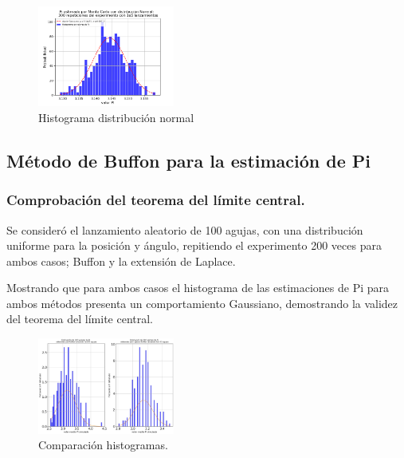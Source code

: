 \documentclass{rbf}
\begin{document}
\begin{figure}[tbp!]
 \centering
  \includegraphics[width=0.4\textwidth]{figures/MCdistNorm.png}
	\caption{Histograma distribución normal}
 \label{buff}
\end{figure}
\subsection{Método de Buffon para la estimación de Pi}
\subsubsection{Comprobación del teorema del límite central.}
Se consideró el lanzamiento aleatorio de 100 agujas, con una distribución uniforme para la posición y ángulo, repitiendo el experimento 200 veces para ambos casos; Buffon y la extensión de Laplace.

Mostrando que para ambos casos el histograma de las estimaciones de Pi para ambos métodos presenta un comportamiento Gaussiano, demostrando la validez del teorema del límite central.
\begin{figure}[tbp!]
 \centering
  \includegraphics[width=0.4\textwidth]{figures/pi_N1.000e+02k200.jpg}
	\caption{Comparación histogramas.}
 \label{buff}
\end{figure}
\end{document}
